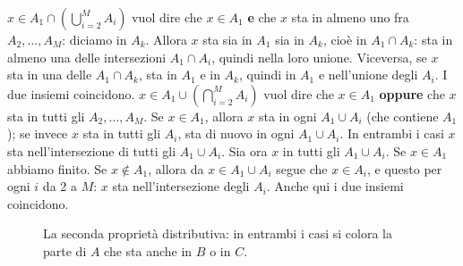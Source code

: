 \begin{dimostrazione}
 $x \in A_1 \cap \left(\bigcup_{i=2}^{M} A_i\right)$ vuol dire che $x \in A_1$
\textbf{e} che $x$ sta in almeno uno fra $A_2, \ldots, A_M$: diciamo in $A_k$.
 Allora $x$ sta sia in $A_1$ sia in $A_k$, cioè in $A_1 \cap A_k$: sta in almeno
una delle intersezioni $A_1 \cap A_i$, quindi nella loro unione. Viceversa, se $x$ sta in una delle $A_1 \cap A_k$,
sta in $A_1$ e in $A_k$, quindi in $A_1$ e nell'unione degli $A_i$. I due insiemi coincidono.
 $x \in A_1 \cup \left(\bigcap_{i=2}^{M} A_i\right)$ vuol dire che $x \in A_1$
\textbf{oppure} che $x$ sta in tutti gli $A_2, \ldots, A_M$.
 Se $x \in A_1$, allora $x$ sta in ogni $A_1 \cup A_i$ (che contiene $A_1$); se
invece $x$ sta in tutti gli $A_i$, sta di nuovo in ogni $A_1 \cup A_i$. In entrambi i casi $x$ sta nell'intersezione
di tutti gli $A_1 \cup A_i$.
 Sia ora $x$ in tutti gli $A_1 \cup A_i$. Se $x \in A_1$ abbiamo finito. Se
$x \notin A_1$, allora da $x \in A_1 \cup A_i$ segue che $x \in A_i$, e questo per ogni $i$ da 2 a $M$: $x$ sta
nell'intersezione degli $A_i$. Anche qui i due insiemi coincidono.
\end{dimostrazione}

\begin{figure}[H]
\centering
{}\hspace{1.2cm}
\caption{La seconda proprietà distributiva: in entrambi i casi si colora la parte di $A$ che sta anche in $B$ o in $C$.}
\end{figure}


